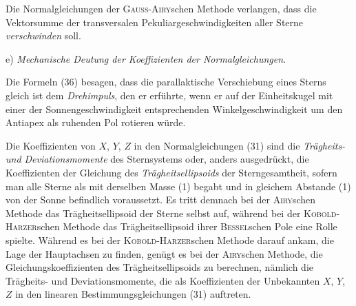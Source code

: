 \documentclass[12pt,a4paper]{article}
\theoremstyle{plain}
\theoremstyle{definition}
\theoremstyle{remark}
\begin{document}
\begin{small}
Die Normalgleichungen der \textsc{Gauss-Airy}schen Methode verlangen, dass die
Vektorsumme der transversalen Pekuliargeschwindigkeiten aller Sterne
\textit{verschwinden} soll.

e) \textit{Mechanische Deutung der Koeffizienten der Normalgleichungen.}

Die Formeln (36) besagen, dass die parallaktische Verschiebung eines Sterns
gleich ist dem \textit{Drehimpuls}, den er erf\"uhrte, wenn er auf der Einheitskugel
mit einer der Sonnengeschwindigkeit entsprechenden Winkelgeschwindigkeit um den
Antiapex als ruhenden Pol rotieren w\"urde.

Die Koeffizienten von $X$, $Y$, $Z$ in den Normalgleichungen (31) sind die
\textit{Tr\"agheits- und Deviationsmomente} des Sternsystems oder, anders ausgedr\"uckt,
die Koeffizienten der Gleichung des \textit{Tr\"agheitsellipsoids} der Sterngesamtheit,
sofern man alle Sterne als mit derselben Masse (1) begabt und in gleichem Abstande
(1) von der Sonne befindlich voraussetzt. Es tritt demnach bei der \textsc{Airy}schen
Methode das Tr\"agheitsellipsoid der Sterne selbst auf, w\"ahrend bei der
\textsc{Kobold-Harzer}schen Methode das Tr\"agheitsellipsoid ihrer \textsc{Bessel}schen
Pole eine Rolle spielte. W\"ahrend es bei der \textsc{Kobold-Harzer}schen Methode
darauf ankam, die Lage der Hauptachsen zu finden, gen\"ugt es bei der
\textsc{Airy}schen Methode, die Gleichungskoeffizienten des Tr\"agheitsellipsoids zu
berechnen, n\"amlich die Tr\"agheits- und Deviationsmomente, die als Koeffizienten
der Unbekannten $X$, $Y$, $Z$ in den linearen Bestimmungsgleichungen (31) auftreten.
\end{small}
\end{document}

